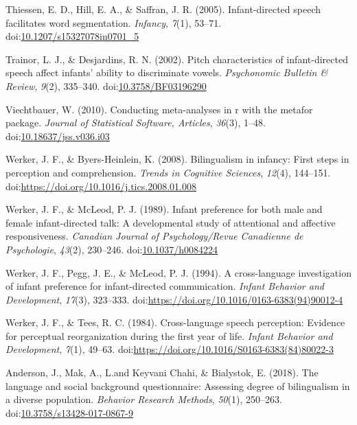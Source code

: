 \documentclass[,man,floatsintext]{apa6}
\begin{document}
\leavevmode\hypertarget{ref-thiessen_2005}{}%
Thiessen, E. D., Hill, E. A., \& Saffran, J. R. (2005). Infant-directed speech facilitates word segmentation. \emph{Infancy}, \emph{7}(1), 53--71. doi:\href{https://doi.org/10.1207/s15327078in0701_5}{10.1207/s15327078in0701\_5}

\leavevmode\hypertarget{ref-trainor_2002}{}%
Trainor, L. J., \& Desjardins, R. N. (2002). Pitch characteristics of infant-directed speech affect infants' ability to discriminate vowels. \emph{Psychonomic Bulletin \& Review}, \emph{9}(2), 335--340. doi:\href{https://doi.org/10.3758/BF03196290}{10.3758/BF03196290}

\leavevmode\hypertarget{ref-viechtbauer_2010}{}%
Viechtbauer, W. (2010). Conducting meta-analyses in r with the metafor package. \emph{Journal of Statistical Software, Articles}, \emph{36}(3), 1--48. doi:\href{https://doi.org/10.18637/jss.v036.i03}{10.18637/jss.v036.i03}

\leavevmode\hypertarget{ref-werker_2008}{}%
Werker, J. F., \& Byers-Heinlein, K. (2008). Bilingualism in infancy: First steps in perception and comprehension. \emph{Trends in Cognitive Sciences}, \emph{12}(4), 144--151. doi:\href{https://doi.org/https://doi.org/10.1016/j.tics.2008.01.008}{https://doi.org/10.1016/j.tics.2008.01.008}

\leavevmode\hypertarget{ref-werker_1989}{}%
Werker, J. F., \& McLeod, P. J. (1989). Infant preference for both male and female infant-directed talk: A developmental study of attentional and affective responsiveness. \emph{Canadian Journal of Psychology/Revue Canadienne de Psychologie}, \emph{43}(2), 230--246. doi:\href{https://doi.org/10.1037/h0084224}{10.1037/h0084224}

\leavevmode\hypertarget{ref-werker_1994}{}%
Werker, J. F., Pegg, J. E., \& McLeod, P. J. (1994). A cross-language investigation of infant preference for infant-directed communication. \emph{Infant Behavior and Development}, \emph{17}(3), 323--333. doi:\href{https://doi.org/https://doi.org/10.1016/0163-6383(94)90012-4}{https://doi.org/10.1016/0163-6383(94)90012-4}

\leavevmode\hypertarget{ref-werker_1984}{}%
Werker, J. F., \& Tees, R. C. (1984). Cross-language speech perception: Evidence for perceptual reorganization during the first year of life. \emph{Infant Behavior and Development}, \emph{7}(1), 49--63. doi:\href{https://doi.org/https://doi.org/10.1016/S0163-6383(84)80022-3}{https://doi.org/10.1016/S0163-6383(84)80022-3}

\leavevmode\hypertarget{ref-anderson_2018}{}%
Anderson, J., Mak, A., L.and Keyvani Chahi, \& Bialystok, E. (2018). The language and social background questionnaire: Assessing degree of bilingualism in a diverse population. \emph{Behavior Research Methods}, \emph{50}(1), 250--263. doi:\href{https://doi.org/10.3758/s13428-017-0867-9}{10.3758/s13428-017-0867-9}
\end{document}
